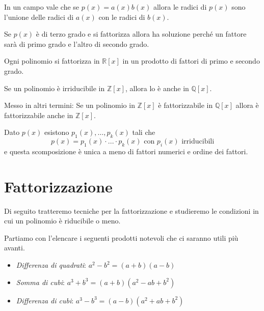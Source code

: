 \begin{observation}
	In un campo vale che se $p(x) = a(x)b(x)$ allora le radici di $p(x)$ sono
	l'unione delle radici di $a(x)$ con le radici di $b(x)$.
\end{observation}

\begin{observation}
	Se $p(x)$ \`e di terzo grado e si fattorizza allora ha soluzione perch\'e un fattore sar\`a
	di primo grado e l'altro di secondo grado.
\end{observation}

\begin{proposition}
	Ogni polinomio si fattorizza in $\mathbb{R}[x]$ in un prodotto di fattori di primo e secondo
	grado.
\end{proposition}

\begin{lemma}
	Se un polinomio \`e irriducibile in $\mathbb{Z}[x]$, allora lo \`e anche in
	$\mathbb{Q}[x]$.

	Messo in altri termini: Se un polinomio in $\mathbb{Z}[x]$ \`e fattorizzabile in
	$\mathbb{Q}[x]$ allora \`e fattorizzabile anche in $\mathbb{Z}[x]$.
\end{lemma}

\begin{theorem}
	Dato $p(x)$ esistono $p_1(x), \dots, p_k(x)$ tali che
	\begin{equation*}
		p(x) = p_1(x) \cdot ... \cdot p_k(x) \text{ con $p_i(x)$ irriducibili}
	\end{equation*}
	e questa scomposizione \`e unica a meno di fattori numerici e ordine dei fattori.
\end{theorem}

\section{Fattorizzazione}
Di seguito tratteremo tecniche per la fattorizzazione e studieremo le condizioni in cui
un polinomio \`e riducibile o meno.

Partiamo con l'elencare i seguenti prodotti notevoli che ci saranno utili pi\`u avanti.
\begin{itemize}
	\item \emph{Differenza di quadrati}: $a^2 - b^2 = (a + b)(a - b)$
	\item \emph{Somma di cubi}: $a^3 + b^3 = (a + b)(a^2 - ab + b^2)$
	\item \emph{Differenza di cubi}: $a^3 - b^3 = (a - b)(a^2 + ab + b^2)$
\end{itemize}

